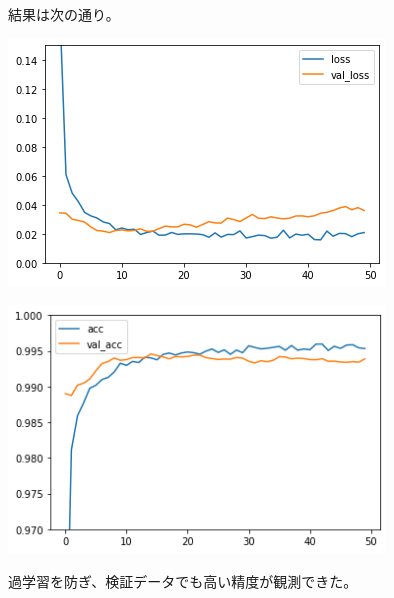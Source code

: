\documentclass[platex,dvipdfmx]{jsarticle}
\begin{document}
結果は次の通り。

\includegraphics[width=10cm]{b1201.png}

\includegraphics[width=10cm]{b1201_acc.png}

過学習を防ぎ、検証データでも高い精度が観測できた。
\end{document}
